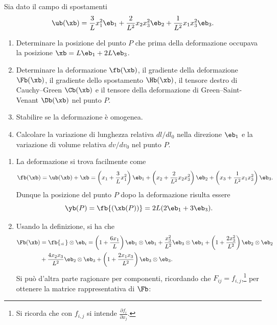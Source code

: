 \begin{exercise}
	Sia dato il campo di spostamenti
	\begin{equation}
		\ub(\xb)=\frac{3}{L}x_1^2\eb_1+\frac{2}{L^2}x_2x_3^2\eb_2+\frac{1}{L^2}x_1x_3^2\eb_3.
	\end{equation}
	\begin{enumerate}
		\item Determinare la posizione del punto $P$ che prima della deformazione occupava la posizione $\xb=L\eb_1+2L\eb_3$.
		\item Determinare la deformazione $\fb(\xb)$, il gradiente della deformazione $\Fb(\xb)$, il gradiente dello spostamento $\Hb(\xb)$, il tensore destro di Cauchy--Green $\Cb(\xb)$ e il tensore della deformazione di Green--Saint-Venant $\Db(\xb)$ nel punto $P$.
		\item Stabilire se la deformazione è omogenea.
		\item Calcolare la variazione di lunghezza relativa $dl/dl_0$ nella direzione $\eb_1$ e la variazione di volume relativa $dv/dv_0$ nel punto $P$.
	\end{enumerate}
	\begin{svolgimento}
		\begin{enumerate}
			\item La deformazione si trova facilmente come
			\begin{equation}
				\fb(\xb)=\ub(\xb)+\xb=\left(x_1+\frac{3}{L}x_1^2\right)\eb_1+\left(x_2+\frac{2}{L^2}x_2x_3^2\right)\eb_2+\left(x_3+\frac{1}{L^2}x_1x_3^2\right)\eb_3.
			\end{equation}
			Dunque la posizione del punto $P$ dopo la deformazione risulta essere
			\begin{equation}
				\yb(P)=\fb{(\xb(P))}=2L(2\eb_1+3\eb_3).
			\end{equation}
			\item
			Usando la definizione, si ha che
			\begin{equation}
				\begin{aligned}
					\Fb(\xb)&=\fb{,_i}\otimes\eb_i=\left(1+\frac{6x_1}{L}\right)\eb_1\otimes\eb_1+\frac{x_3^2}{L^2}\eb_3\otimes\eb_1+\left(1+\frac{2x_3^2}{L^2}\right)\eb_2\otimes\eb_2\\
					&+\frac{4x_2x_3}{L^2}\eb_2\otimes\eb_3+\left(1+\frac{2x_1x_3}{L^2}\right)\eb_3\otimes\eb_3.
				\end{aligned}
			\end{equation}
			Si può d'altra parte ragionare per componenti, ricordando che $F_{ij}=f_{i,j}$,\footnote{Si ricorda che con $f_{i,j}$ si intende $\frac{\partial f_i}{\partial x_j}$.} per ottenere la matrice rappresentativa di $\Fb$:

\end{enumerate}
\end{svolgimento}
\end{exercise}
